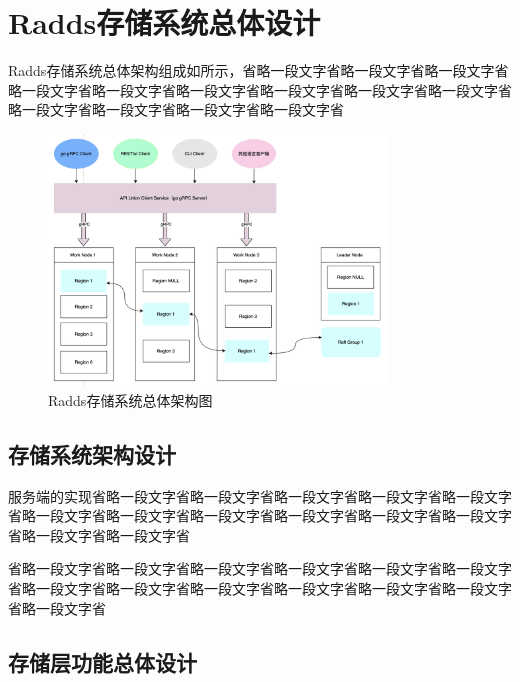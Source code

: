 \section{Radds存储系统总体设计}

	Radds存储系统总体架构组成如所示，省略一段文字省略一段文字省略一段文字省略一段文字省略一段文字省略一段文字省略一段文字省略一段文字省略一段文字省略一段文字省略一段文字省略一段文字省略一段文字省
		
	\begin{figure}[H]
		\centering
		\includegraphics[width=0.80\textwidth]{images/radds_system_arch}
		\caption{Radds存储系统总体架构图}
		\label{overall_structure}
	\end{figure}
	
	\subsection{存储系统架构设计}
	
		服务端的实现省略一段文字省略一段文字省略一段文字省略一段文字省略一段文字省略一段文字省略一段文字省略一段文字省略一段文字省略一段文字省略一段文字省略一段文字省略一段文字省		  
		  
		 省略一段文字省略一段文字省略一段文字省略一段文字省略一段文字省略一段文字省略一段文字省略一段文字省略一段文字省略一段文字省略一段文字省略一段文字省略一段文字省
		 
		  		  
		  
	\subsection{存储层功能总体设计}
			
